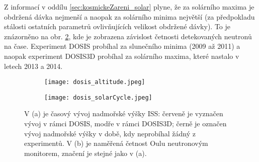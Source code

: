 Z informací v oddílu \ref{sec:kosmickeZareni_solar} plyne, že za solárního maxima je obdržená dávka nejmenší a naopak za solárního minima největší (za předpokladu stálosti ostatních parametrů ovlivňujících velikost obdržené dávky). To je znázorněno na obr. \ref{subfig:dosis_solarCycle}, kde je zobrazena závislost četnosti detekovaných neutronů na čase. Experiment DOSIS probíhal za slunečního minima (2009 až 2011) a naopak experiment DOSIS3D probíhal za solárního maxima, které nastalo v letech 2013 a 2014.   
\begin{figure}[h]
  \centering
  \begin{subfigure}{0.45\textwidth}
    \texttt{[image: dosis\_altitude.jpeg]}
    \caption{}
    \label{subfig:dosis_altitude}
  \end{subfigure}
  \begin{subfigure}{0.45\textwidth}
    \texttt{[image: dosis\_solarCycle.jpeg]}
    \caption{}
    \label{subfig:dosis_solarCycle}
  \end{subfigure}
  \caption{V (a) je časový vývoj nadmořské výšky ISS: červeně je vyznačen vývoj v rámci DOSIS, modře v rámci DOSIS3D; černě je označen vývoj nadmořské výšky v době, kdy neprobíhal žádný z experimentů. V (b) je naměřená četnost Oulu neutronovým monitorem, značení je stejné jako v (a). \cite{dosis}} 
  \label{fig:dosis_parameters}
\end{figure}






